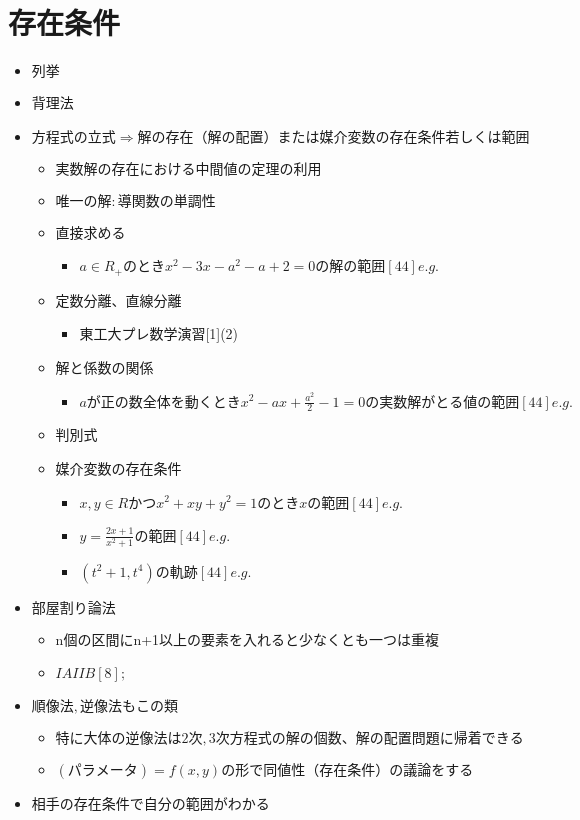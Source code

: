 \documentclass[dvipdfmx,uplatex]{jsarticle}
\begin{document}
\section{存在条件}
\begin{itemize}
	\item $ 列挙$
	\item 背理法
	\item $ 方程式の立式 \Rightarrow 解の存在（解の配置）または媒介変数の存在条件若しくは範囲$
	\begin{itemize}
		\item $ 実数解の存在における中間値の定理の利用$
		\item $ 唯一の解: 導関数の単調性$
		\item 直接求める
		\begin{itemize}
			\item $a\in R_+のときx^2-3x-a^2-a+2=0の解の範囲[44]e.g.$
		\end{itemize}
		\item 定数分離、直線分離
		\begin{itemize}
			\item 東工大プレ数学演習[1](2)
		\end{itemize}
		\item 解と係数の関係
		\begin{itemize}
			\item $aが正の数全体を動くときx^2-ax+\frac{a^2}{2}-1=0の実数解がとる値の範囲[44]e.g.$
		\end{itemize}
		\item 判別式
		\item 媒介変数の存在条件
		\begin{itemize}
			\item $x,y\in Rかつx^2+xy+y^2=1のときxの範囲[44]e.g.$
			\item $y=\frac{2x+1}{x^2+1}の範囲[44]e.g.$
			\item $(t^2+1,t^4)の軌跡[44]e.g.$
		\end{itemize}
	\end{itemize}
	\item $ 部屋割り論法$
	\begin{itemize}
		\item n個の区間にn+1以上の要素を入れると少なくとも一つは重複
		\item $ IAIIB[8];$
	\end{itemize}
	\item $ 順像法,逆像法もこの類$
	\begin{itemize}
		\item $ 特に大体の逆像法は2次,3次方程式の解の個数、解の配置問題に帰着できる$
		\item $ (パラメータ) = f(x,y) の形で同値性（存在条件）の議論をする$
	\end{itemize}
	\item 相手の存在条件で自分の範囲がわかる
\end{itemize}
\end{document}
